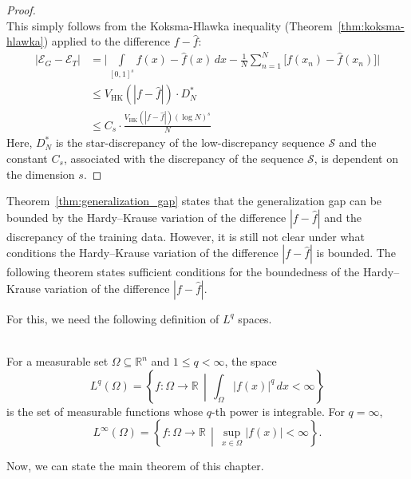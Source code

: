 \begin{proof} \ \\
    This simply follows from the Koksma-Hlawka inequality
    (Theorem~\ref{thm:koksma-hlawka}) applied to the difference $f-\hat{f}$:
    \begin{align*}
        |\mathcal{E}_G - \mathcal{E}_T| &= \bigg| \int\limits_{[0,1]^s} f(x) - \hat{f}(x) \, dx - \frac{1}{N} \sum_{n=1}^N \big[f(x_n) - \hat{f}(x_n)\big] \bigg| \\
        &\leq V_{\mathrm{HK}}(|f-\hat{f}|) \cdot D^*_N \\
        &\leq C_s \cdot \frac{V_{\mathrm{HK}}(|f-\hat{f}|)(\log N)^s}{N}
    \end{align*}
    Here, $D^*_N$ is the star-discrepancy of the low-discrepancy sequence
    $\mathcal{S}$ and the constant $C_s$, associated with the discrepancy of the sequence $\mathcal{S}$, is dependent on the dimension $s$.
\end{proof}

Theorem~\ref{thm:generalization_gap} states that the generalization gap can be
bounded by the Hardy--Krause variation of the difference $|f-\hat{f}|$ and the
discrepancy of the training data. However, it is still not clear under what
conditions the Hardy--Krause variation of the difference $|f-\hat{f}|$ is
bounded. The following theorem states sufficient conditions for the boundedness
of the Hardy--Krause variation of the difference $|f-\hat{f}|$.

For this, we need the following definition of $L^q$ spaces.

\begin{definition} \ \\
For a measurable set $\Omega \subseteq \mathbb{R}^n$ and $1 \leq q < \infty$, the space
\begin{equation*}
L^q(\Omega) = \left\{ f : \Omega \to \mathbb{R} \,\middle|\, 
\int_{\Omega} |f(x)|^q \, dx < \infty \right\}
\end{equation*}
is the set of measurable functions whose $q$-th power is integrable.  
For $q = \infty$,
\begin{equation*}
L^\infty(\Omega) = \left\{ f : \Omega \to \mathbb{R} \,\middle|\, 
\sup_{x \in \Omega} |f(x)| < \infty \right\}.
\end{equation*}
\end{definition}

Now, we can state the main theorem of this chapter.

